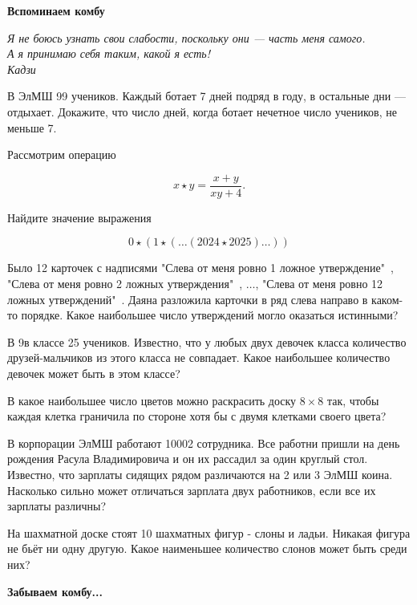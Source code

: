 \centerline{\bf \Huge Вспоминаем комбу}

\begin{flushright}
        \scriptsize{\it Я не боюсь узнать свои слабости, поскольку они — часть меня самого.\\ А я принимаю себя таким, какой я есть!\\ Кадзи}
\end{flushright}

В ЭлМШ 99 учеников. Каждый ботает 7 дней подряд в году, в остальные дни --- отдыхает. Докажите, что число дней, когда ботает нечетное число учеников, не меньше 7.

Рассмотрим операцию

$$
x \star y=\frac{x+y}{x y+4} .
$$

Найдите значение выражения

$$
0 \star(1 \star(\ldots(2024 \star 2025) \ldots))
$$

Было 12 карточек с надписями "Слева от меня ровно 1 ложное утверждение"\ , "Слева от меня ровно 2 ложных утверждения"\ , $\ldots$, "Слева от меня ровно 12 ложных утверждений"\ . Даяна разложила карточки в ряд слева направо в каком-то порядке. Какое наибольшее число утверждений могло оказаться истинными?

В 9в классе 25 учеников. Известно, что у любых двух девочек класса количество друзей-мальчиков из этого класса не совпадает. Какое наибольшее количество девочек может быть в этом классе?

В какое наибольшее число цветов можно раскрасить доску $8 \times 8$ так, чтобы каждая клетка граничила по стороне хотя бы с двумя клетками своего цвета?

В корпорации ЭлМШ работают 10002 сотрудника. Все работни пришли на день рождения Расула Владимировича и он их рассадил за один круглый стол. Известно, что зарплаты сидящих рядом различаются на 2 или 3 ЭлМШ коина. Насколько сильно может отличаться зарплата двух работников, если все их зарплаты различны?

На шахматной доске стоят 10 шахматных фигур - слоны и ладьи. Никакая фигура не бьёт ни одну другую. Какое наименьшее количество слонов может быть среди них?


\newpage

\hspace{3mm}

\centerline{\bf \Huge Забываем комбу...}

